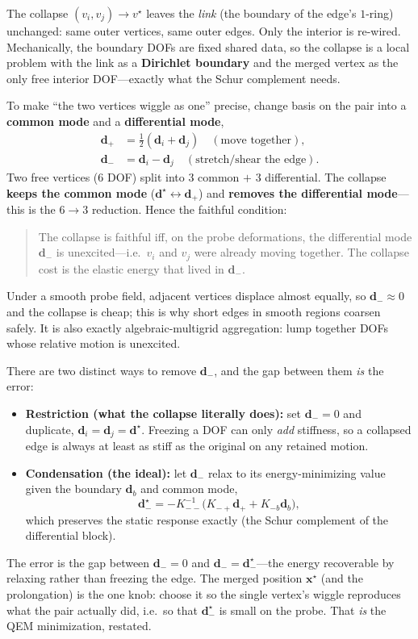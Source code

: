 The collapse $(v_i,v_j)\to v^\star$ leaves the \emph{link} (the boundary of the edge's $1$-ring) unchanged: same outer vertices, same outer edges.
Only the interior is re-wired.
Mechanically, the boundary DOFs are fixed shared data, so the collapse is a local problem with the link as a \textbf{Dirichlet boundary} and the merged vertex as the only free interior DOF---exactly what the Schur complement needs.

To make ``the two vertices wiggle as one'' precise, change basis on the pair into a \textbf{common mode} and a \textbf{differential mode},
\begin{align*}
  \mathbf{d}_+ &= \tfrac12(\mathbf{d}_i + \mathbf{d}_j)
    \quad(\text{move together}),
  \\
  \mathbf{d}_- &= \mathbf{d}_i - \mathbf{d}_j
    \quad(\text{stretch/shear the edge}).
\end{align*}
Two free vertices ($6$ DOF) split into $3$ common $+$ $3$ differential.
The collapse \textbf{keeps the common mode} ($\mathbf{d}^\star\leftrightarrow\mathbf{d}_+$) and \textbf{removes the differential mode}---this is the $6\to3$ reduction.
Hence the faithful condition:
\begin{quote}
  The collapse is faithful iff, on the probe deformations, the differential mode $\mathbf{d}_-$ is unexcited---i.e.\ $v_i$ and $v_j$ were already moving together.
  The collapse cost is the elastic energy that lived in $\mathbf{d}_-$.
\end{quote}
Under a smooth probe field, adjacent vertices displace almost equally, so $\mathbf{d}_-\approx 0$ and the collapse is cheap; this is why short edges in smooth regions coarsen safely.
It is also exactly algebraic-multigrid aggregation: lump together DOFs whose relative motion is unexcited.

There are two distinct ways to remove $\mathbf{d}_-$, and the gap between them \emph{is} the error:
\begin{itemize}
  \item \textbf{Restriction (what the collapse literally does):} set $\mathbf{d}_-=0$ and duplicate, $\mathbf{d}_i=\mathbf{d}_j=\mathbf{d}^\star$.
        Freezing a DOF can only \emph{add} stiffness, so a collapsed edge is always at least as stiff as the original on any retained motion.
  \item \textbf{Condensation (the ideal):} let $\mathbf{d}_-$ relax to its energy-minimizing value given the boundary $\mathbf{d}_b$ and common mode,
        \begin{equation}
          \mathbf{d}_-^\star
            = -K_{--}^{-1}\big(K_{-+}\mathbf{d}_+ + K_{-b}\mathbf{d}_b\big),
        \end{equation}
        which preserves the static response exactly (the Schur complement of the differential block).
\end{itemize}
The error is the gap between $\mathbf{d}_-=0$ and $\mathbf{d}_-=\mathbf{d}_-^\star$---the energy recoverable by relaxing rather than freezing the edge.
The merged position $\mathbf{x}^\star$ (and the prolongation) is the one knob: choose it so the single vertex's wiggle reproduces what the pair actually did, i.e.\ so that $\mathbf{d}_-^\star$ is small on the probe.
That \emph{is} the QEM minimization, restated.


